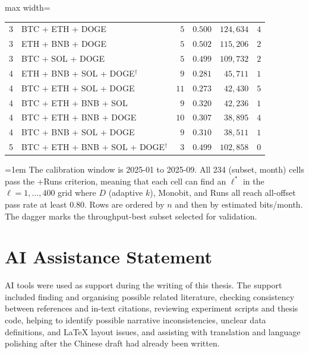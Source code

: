 \documentclass[11pt,titlepage,openany,oneside]{book}  %
\let\cleardoublepage\clearpage
\newcommand{\floatnote}[1]{%
  \par\smallskip\noindent%
  \begin{minipage}{\linewidth}%
    \footnotesize\emergencystretch=1em #1%
  \end{minipage}\par%
}
\begin{document}
\begin{table}[!htbp]
\begin{center}
\begin{adjustbox}{max width=\textwidth}
\begin{tabular}{rlrrrr}
      3 & BTC + ETH + DOGE                     & $5$  & $0.500$ & $124{,}634$ & $4$ \\
      3 & ETH + BNB + DOGE                     & $5$  & $0.502$ & $115{,}206$ & $2$ \\
      3 & BTC + SOL + DOGE                     & $5$  & $0.499$ & $109{,}732$ & $2$ \\
      \midrule
      4 & ETH + BNB + SOL + DOGE$^\dagger$     & $9$  & $0.281$ & $45{,}711$  & $1$ \\
      4 & BTC + ETH + SOL + DOGE               & $11$ & $0.273$ & $42{,}430$  & $5$ \\
      4 & BTC + ETH + BNB + SOL                & $9$  & $0.320$ & $42{,}236$  & $1$ \\
      4 & BTC + ETH + BNB + DOGE               & $10$ & $0.307$ & $38{,}895$  & $4$ \\
      4 & BTC + BNB + SOL + DOGE               & $9$  & $0.310$ & $38{,}511$  & $1$ \\
      \midrule
      5 & BTC + ETH + BNB + SOL + DOGE$^\dagger$ & $3$ & $0.499$ & $102{,}858$ & $0$ \\
      \bottomrule
    \end{tabular}
    \end{adjustbox}
  \end{center}
  \floatnote{The calibration window is 2025-01 to 2025-09. All 234 (subset, month) cells pass the +Runs criterion, meaning that each cell can find an $\ell^*$ in the $\ell = 1,\ldots,400$ grid where $D$ (adaptive $k$), Monobit, and Runs all reach all-offset pass rate at least $0.80$. Rows are ordered by $n$ and then by estimated bits/month. The dagger marks the throughput-best subset selected for validation.}
\end{table}




\cleardoublepage
\chapter*{AI Assistance Statement}

AI tools were used as support during the writing of this thesis. The support included finding and organising possible related literature, checking consistency between references and in-text citations, reviewing experiment scripts and thesis code, helping to identify possible narrative inconsistencies, unclear data definitions, and LaTeX layout issues, and assisting with translation and language polishing after the Chinese draft had already been written.
\end{document}
